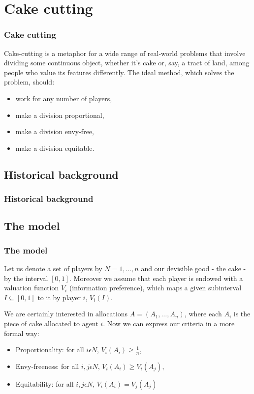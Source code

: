 \documentclass{beamer}
\begin{document}
\section{Cake cutting}
\begin{frame}
\frametitle{Cake cutting}
Cake-cutting is a metaphor for a wide range of real-world problems that involve dividing some continuous object, whether it’s cake or, say, a tract of land, among people who value its features differently. 
The ideal method, which solves the problem, should:
\begin{itemize}
\item work for any number of players,
\item make a division proportional,
\item make a division envy-free, 
\item make a division equitable. 
\end{itemize}

\end{frame}

\subsection{Historical background}
\begin{frame}
\frametitle{Historical background}
\end{frame}


\subsection{The model}
\begin{frame}
\frametitle{The model}
    Let us denote a set of players by $N={1,\dots,n}$ and our devisible good - the cake - by the interval $[0,1]$. Moreover we assume that each player is endowed with a valuation function $V_{i}$ (information preference), which maps a given subinterval $I\subseteq[0,1]$ to it by player $i$, $V_{i}(I)$. 

    We are certainly interested in allocations $A=(A_1,\dots,A_n)$, where each $A_i$ is the piece of cake allocated to agent $i$. Now we can express our criteria in a more formal way:
\begin{itemize}
    \item Proportionality: for all $i\epsilon{N}$, $V_{i}(A_i)\geq\frac{1}{n}$,
    \item Envy-freeness: for all $i,j\epsilon{N}$, $V_{i}(A_i)\geq{V_i}(A_j)$,
    \item Equitability: for all $i,j\epsilon{N}$, $V_{i}(A_i)={V_j}(A_j)$
\end{itemize}
\end{frame}
\end{document}
